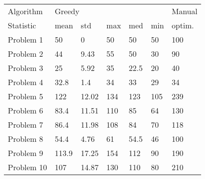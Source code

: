 \begin{tabular}{lllllll}
\toprule
Algorithm & \multicolumn{5}{l}{Greedy} & Manual \\
Statistic &   mean &    std &  max &   med &  min & optim. \\
\midrule
Problem 1  &     50 &      0 &   50 &    50 &   50 &    100 \\
Problem 2  &     44 &   9.43 &   55 &    50 &   30 &     90 \\
Problem 3  &     25 &   5.92 &   35 &  22.5 &   20 &     40 \\
Problem 4  &   32.8 &    1.4 &   34 &    33 &   29 &     34 \\
Problem 5  &    122 &  12.02 &  134 &   123 &  105 &    239 \\
Problem 6  &   83.4 &  11.51 &  110 &    85 &   64 &    130 \\
Problem 7  &   86.4 &  11.98 &  108 &    84 &   70 &    118 \\
Problem 8  &   54.4 &   4.76 &   61 &  54.5 &   46 &    100 \\
Problem 9  &  113.9 &  17.25 &  154 &   112 &   90 &    190 \\
Problem 10 &    107 &  14.87 &  130 &   110 &   80 &    210 \\
\bottomrule
\end{tabular}
